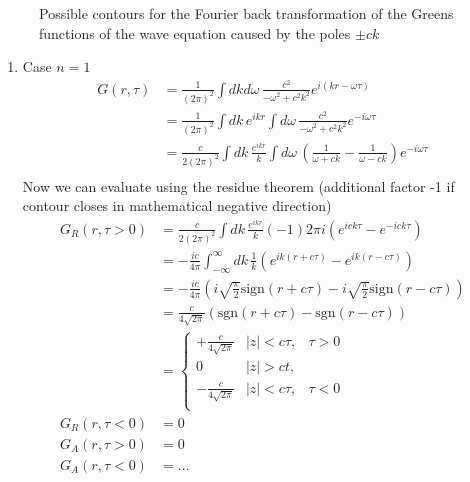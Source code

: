 \documentclass[10pt,a4paper]{book}
\theoremstyle{definition}
\begin{document}
\begin{itemize}
\begin{figure}[!h]
\begin{center}
\end{center}

\caption{Possible contours for the Fourier back transformation of the Greens functions of the wave equation caused by the poles $\pm ck$}
\end{figure}

\begin{enumerate}
\item Case $n=1$
\begin{align}
G(r,\tau)
&=\frac{1}{(2\pi)^2}\int dkd\omega\,\frac{c^2}{-\omega^2+c^2k^2}e^{i(kr-\omega\tau)}\\
&=\frac{1}{(2\pi)^2}\int dk\,e^{ikr}\int d\omega\,\frac{c^2}{-\omega^2+c^2k^2}e^{-i\omega\tau}\\
&=\frac{c}{2(2\pi)^2}\int dk\,\frac{e^{ikr}}{k}\int d\omega\,\left(\frac{1}{\omega+ck}-\frac{1}{\omega-ck}\right)e^{-i\omega\tau}\\
\end{align}
Now we can evaluate using the residue theorem (additional factor -1 if contour closes in mathematical negative direction)
\begin{align}
G_R(r,\tau>0)
&=\frac{c}{2(2\pi)^2}\int dk\,\frac{e^{ikr}}{k}(-1)2\pi i\left(e^{ick\tau}-e^{-ick\tau}\right)\\
&=-\frac{ic}{4\pi}\int_{-\infty}^\infty dk\,\frac{1}{k}\left(e^{ik(r+c\tau)}-e^{ik(r-c\tau)}\right)\\
&=-\frac{ic}{4\pi}\left(i\sqrt{\frac{\pi}{2}}\text{sign}(r+c\tau)-i\sqrt{\frac{\pi}{2}}\text{sign}(r-c\tau)\right)\\
&=\frac{c}{4\sqrt{2\pi}}\left(\text{sgn}(r+c\tau)-\text{sgn}(r-c\tau)\right)\\
&=\left\{\begin{matrix}
+\frac{c}{4\sqrt{2\pi}}&|z|<c\tau,& \tau>0\\
0& |z|>ct,&\\
-\frac{c}{4\sqrt{2\pi}}&|z|<c\tau,& \tau<0\\
\end{matrix}\right.\\
G_R(r,\tau<0)&=0\\
G_A(r,\tau>0)&=0\\
G_A(r,\tau<0)&=...\\
\end{align}


\end{enumerate}
\end{itemize}
\end{document}
